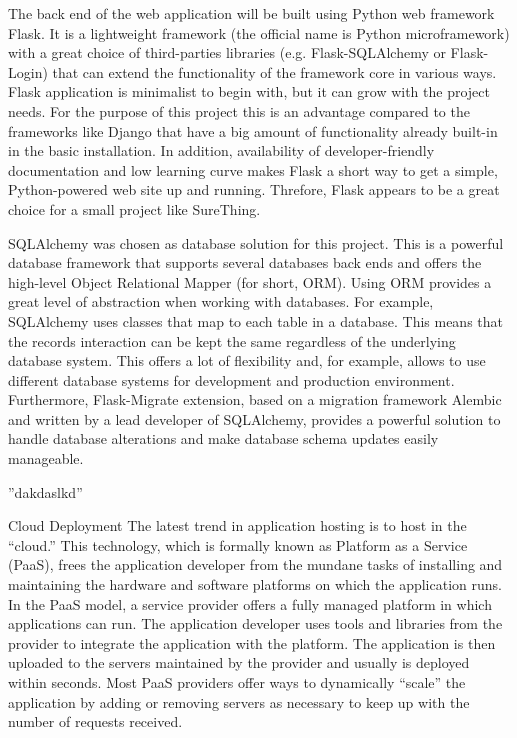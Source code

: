 The back end of the web application will be built using Python web framework Flask\cite{flask}. It is a lightweight framework (the official name is Python microframework) with a great choice of third-parties libraries (e.g. Flask-SQLAlchemy or Flask-Login) that can extend the functionality of the framework core in various ways. Flask application is minimalist to begin with, but it can grow with the project needs. For the purpose of this project this is an advantage compared to the frameworks like Django that have a big amount of functionality already built-in in the basic installation. In addition, availability of developer-friendly documentation and low learning curve makes Flask a short way to get a simple, Python-powered web site up and running. Threfore, Flask appears to be a great choice for a small project like SureThing. \par

SQLAlchemy was chosen as database solution for this project\cite{sqlalchemy}. This is a powerful database framework that supports several databases back ends and offers the high-level Object Relational Mapper (for short, ORM). Using ORM provides a great level of abstraction when working with databases. For example, SQLAlchemy uses classes that map to each table in a database. This means that the records interaction can be kept the same regardless of the underlying database system. This offers a lot of flexibility and, for example, allows to use different database systems for development and production environment. Furthermore, Flask-Migrate extension, based on a migration framework Alembic and written by a lead developer of SQLAlchemy, provides a powerful solution to handle database alterations and make database schema updates easily manageable\cite{book:Grindberg2014FlaskWebDevelopment}.\par
	
	
	\citet{book:Grindberg2014FlaskWebDevelopment}''dakdaslkd''


Cloud Deployment The latest trend in application hosting is to host in the “cloud.” This technology, which is formally known as Platform as a Service (PaaS), frees the application developer from the mundane tasks of installing and maintaining the hardware and software platforms on which the application runs. In the PaaS model, a service provider offers a fully managed platform in which applications can run. The application developer uses tools and libraries from the provider to integrate the application with the platform. The application is then uploaded to the servers maintained by the provider and usually is deployed within seconds. Most PaaS providers offer ways to dynamically “scale” the application by adding or removing servers as necessary to keep up with the number of requests received.


